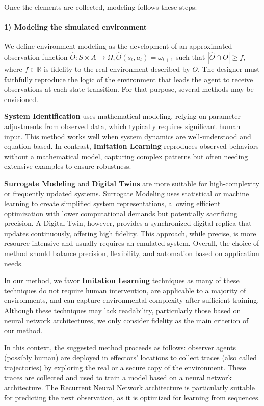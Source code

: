 \documentclass[pdflatex,sn-mathphys-num]{sn-jnl}%
\theoremstyle{thmstyleone}%
\theoremstyle{thmstyletwo}%
\theoremstyle{thmstylethree}%
\begin{document}
Once the elements are collected, modeling follows these steps: 


\paragraph{\textbf{1) Modeling the simulated environment}} \quad

\noindent We define environment modeling as the development of an approximated observation function $\hat{O}: S \times A \to \Omega, \hat{O}(s_t,a_t) = \omega_{t+1}$ such that $|\hat{O} \cap O| \geq f$, where $f \in \mathbb{R}$ is fidelity to the real environment described by $O$.
The designer must faithfully reproduce the logic of the environment that leads the agent to receive observations at each state transition. 
For that purpose, several methods may be envisioned.

\textbf{System Identification} uses mathematical modeling, relying on parameter adjustments from observed data, which typically requires significant human input. This method works well when system dynamics are well-understood and equation-based. In contrast, \textbf{Imitation Learning} reproduces observed behaviors without a mathematical model, capturing complex patterns but often needing extensive examples to ensure robustness.

\textbf{Surrogate Modeling} and \textbf{Digital Twins} are more suitable for high-complexity or frequently updated systems. Surrogate Modeling uses statistical or machine learning to create simplified system representations, allowing efficient optimization with lower computational demands but potentially sacrificing precision. A Digital Twin, however, provides a synchronized digital replica that updates continuously, offering high fidelity. This approach, while precise, is more resource-intensive and usually requires an emulated system. Overall, the choice of method should balance precision, flexibility, and automation based on application needs.

In our method, we favor \textbf{Imitation Learning} techniques as many of these techniques do not require human intervention, are applicable to a majority of environments, and can capture environmental complexity after sufficient training. Although these techniques may lack readability, particularly those based on neural network architectures, we only consider fidelity as the main criterion of our method.

In this context, the suggested method proceeds as follows: observer agents (possibly human) are deployed in effectors' locations to collect traces (also called trajectories) by exploring the real or a secure copy of the environment. These traces are collected and used to train a model based on a neural network architecture. The Recurrent Neural Network architecture is particularly suitable for predicting the next observation, as it is optimized for learning from sequences.
\end{document}
